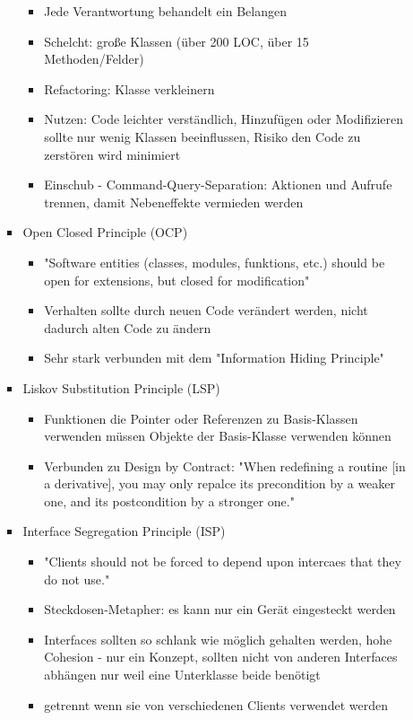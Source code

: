 \documentclass[paper=a4, fontsize=11pt]{scrartcl} %
\numberwithin{equation}{section} %
\numberwithin{figure}{section} %
\numberwithin{table}{section} %
\begin{document}
\begin{itemize}
\begin{itemize}
\begin{itemize}
\begin{itemize}
        \item Jede Verantwortung behandelt ein Belangen
        \item Schelcht: große Klassen (über 200 LOC, über 15 Methoden/Felder)
        \item Refactoring: Klasse verkleinern
        \item Nutzen: Code leichter verständlich, Hinzufügen oder Modifizieren sollte nur wenig Klassen beeinflussen, Risiko den Code zu zerstören wird minimiert
        \item Einschub - Command-Query-Separation: Aktionen und Aufrufe trennen, damit Nebeneffekte vermieden werden
      \end{itemize}
      \item Open Closed Principle (OCP)
      \begin{itemize}
        \item "Software entities (classes, modules, funktions, etc.) should be open for extensions, but closed for modification"
        \item Verhalten sollte durch neuen Code verändert werden, nicht dadurch alten Code zu ändern
        \item Sehr stark verbunden mit dem "Information Hiding Principle"
      \end{itemize}
      \item Liskov Substitution Principle (LSP)
      \begin{itemize}
        \item Funktionen die Pointer oder Referenzen zu Basis-Klassen verwenden müssen Objekte der Basis-Klasse verwenden können
        \item Verbunden zu Design by Contract: "When redefining a routine [in a derivative], you may only repalce its precondition by a weaker one, and its postcondition by a stronger one."
      \end{itemize}
      \item Interface Segregation Principle (ISP)
      \begin{itemize}
        \item "Clients should not be forced to depend upon intercaes that they do not use."
        \item Steckdosen-Metapher: es kann nur ein Gerät eingesteckt werden
        \item Interfaces sollten so schlank wie möglich gehalten werden, hohe Cohesion - nur ein Konzept, sollten nicht von anderen Interfaces abhängen nur weil eine Unterklasse beide benötigt
        \item getrennt wenn sie von verschiedenen Clients verwendet werden

\end{itemize}
\end{itemize}
\end{itemize}
\end{itemize}
\end{document}
